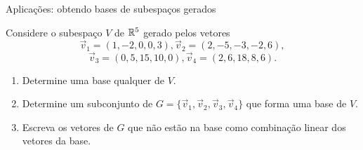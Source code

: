 %
%
%

\begin{frame}[label=lild]{Aplicações: obtendo bases de subespaços gerados}
\begin{exe} Considere o subespaço $V$ de $\mathbb{R}^5$ gerado pelos vetores
\[\vec{v}_1=(1,-2,0,0,3), \vec{v}_2=(2,-5,-3,-2,6),
\]
\[\vec{v}_3=(0,5,15,10,0), \vec{v}_4=(2,6,18,8,6).
\]
\begin{enumerate}
\item Determine uma base qualquer de $V$.

\item Determine um subconjunto de $G=\{\vec{v}_1,\vec{v}_2,\vec{v}_3,\vec{v}_4\}$ que forma uma base de $V$.
\item Escreva os vetores de $G$ que não estão na base como combinação linear dos vetores da base.
\end{enumerate}

\end{exe}

\end{frame}








